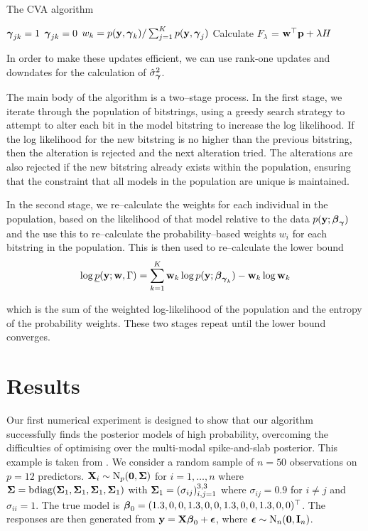 \begin{algorithm}
	\caption{The CVA algorithm}
	\label{alg:algorithm_cva}
	\begin{algorithmic}
						\STATE ${\boldsymbol \gamma}_{jk} = 1$
					\ELSE
						\STATE ${\boldsymbol \gamma}_{jk} = 0$
					\ENDIF
				\ENDFOR
				\STATE $w_k = p({\bf y}, {\boldsymbol \gamma}_k) / \sum_{j=1}^K p({\bf y}, {\boldsymbol \gamma}_j)$
			\ENDFOR
			\STATE Calculate $F_\lambda$ = ${\bf w}^\top {\bf p} + \lambda H$
		\ENDWHILE
	\end{algorithmic}
\end{algorithm}
In order to make these updates efficient, we can use rank-one updates and downdates for the calculation of
$\hat{\sigma}_{\boldsymbol \gamma}^2$.

The main body of the algorithm is a two--stage process. In the first stage, we iterate through the population of
bitstrings, using a greedy search strategy to attempt to alter each bit in the model bitstring to increase the log likelihood. If the log likelihood for the new bitstring is no higher than the previous bitstring, then the
alteration is rejected and the next alteration tried. The alterations are also rejected if the new bitstring
already exists within the population, ensuring that the constraint that all models in the population are
unique is maintained.

In the second stage, we re--calculate the weights for each individual in the population, based on the
likelihood of that model relative to the data $p({\bf y}; {\boldsymbol \beta}_{\boldsymbol \gamma})$ and the use this to re--calculate the
probability--based weights $w_i$ for each bitstring in the population. This is then used to re--calculate the
lower bound
\[
	\log \underline{p}({\bf y}; {\bf w}, \Gamma) = \sum_{k=1}^K {\bf w}_k \log p({\bf y}; {\boldsymbol \beta}_{{\boldsymbol \gamma}_k}) - {\bf w}_k \log {\bf w}_k
\]

which is the sum of the weighted log-likelihood of the population and the entropy of the probability weights.
These two stages repeat until the lower bound converges.

\section{Results}


Our first numerical experiment is designed to show that our algorithm successfully finds the posterior models
of high probability, overcoming the difficulties of optimising over the multi-modal spike-and-slab posterior.
This example is taken from \citep{Rockova2016}. 
We consider a random sample of $n = 50$ observations on $p = 12$ predictors. ${\bf X}_i \sim \text{N}_p({\bf 0}, {\boldsymbol \Sigma})$
for $i = 1, \ldots, n$ where
${\boldsymbol \Sigma} = \text{bdiag}({\boldsymbol \Sigma}_1, {\boldsymbol \Sigma}_1, {\boldsymbol \Sigma}_1, {\boldsymbol \Sigma}_1)$ with
${\boldsymbol \Sigma}_1 = (\sigma_{ij})_{i, j = 1}^{3, 3}$ where $\sigma_{ij} = 0.9$ for $i \ne j$ and $\sigma_{ii} = 1$.
The true model is ${\boldsymbol \beta}_0 = (1.3, 0, 0, 1.3, 0, 0, 1.3, 0, 0, 1.3, 0, 0)^\top$.
The responses are then generated from ${\bf y} = {\bf X} {\boldsymbol \beta}_0 + {\boldsymbol \epsilon}$, where
${\boldsymbol \epsilon} \sim \text{N}_n({\bf 0}, {\bf I}_n)$.

